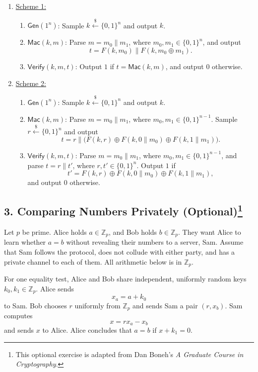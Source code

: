 \documentclass[11pt]{article}
\newcommand{\Gen}{\mathsf{Gen}}
\newcommand{\bin}{\{0,1\}}
\newcommand{\bit}{\bin}
\newcommand{\getsr}{\stackrel{\$}{\gets}}
\newcommand{\mac}{\mathsf{Mac}}
\newcommand{\verify}{\mathsf{Verify}}
\begin{document}
\begin{enumerate}
    \item \underline{Scheme 1:}
    \begin{enumerate}
        \item $\Gen(1^n)$: Sample $k\getsr\bit^n$ and output $k$.
        \item $\mac(k,m)$: Parse $m=m_0\mathbin\|m_1$, where
        $m_0,m_1\in\bit^n$, and output
        \[
            t=F(k,m_0)\mathbin\|F(k,m_0\oplus m_1).
        \]
        \item $\verify(k,m,t)$: Output $1$ if $t=\mac(k,m)$, and output
        $0$ otherwise.
    \end{enumerate}

    \item \underline{Scheme 2:}
    \begin{enumerate}
        \item $\Gen(1^n)$: Sample $k\getsr\bit^n$ and output $k$.
        \item $\mac(k,m)$: Parse $m=m_0\mathbin\|m_1$, where
        $m_0,m_1\in\bit^{n-1}$. Sample $r\getsr\bit^n$ and output
        \[
            t=r\mathbin\|\bigl(F(k,r)\oplus F(k,0\mathbin\|m_0)
              \oplus F(k,1\mathbin\|m_1)\bigr).
        \]
        \item $\verify(k,m,t)$: Parse $m=m_0\mathbin\|m_1$, where
        $m_0,m_1\in\bit^{n-1}$, and parse $t=r\mathbin\|t'$, where
        $r,t'\in\bit^n$. Output $1$ if
        \[
            t'=F(k,r)\oplus F(k,0\mathbin\|m_0)
                \oplus F(k,1\mathbin\|m_1),
        \]
        and output $0$ otherwise.
    \end{enumerate}
\end{enumerate}

\pagebreak

\subsection*{3. Comparing Numbers Privately (Optional)\footnote{This
optional exercise is adapted from Dan Boneh's \emph{A Graduate Course in
Cryptography}.}}

Let $p$ be prime. Alice holds $a\in\mathbb{Z}_p$, and Bob holds
$b\in\mathbb{Z}_p$. They want Alice to learn whether $a=b$ without
revealing their numbers to a server, Sam. Assume that Sam follows the
protocol, does not collude with either party, and has a private channel
to each of them. All arithmetic below is in $\mathbb{Z}_p$.

For one equality test, Alice and Bob share independent, uniformly random
keys $k_0,k_1\in\mathbb{Z}_p$. Alice sends
\[
    x_a=a+k_0
\]
to Sam. Bob chooses $r$ uniformly from $\mathbb{Z}_p$ and sends Sam a pair
$(r,x_b)$. Sam computes
\[
    x=rx_a-x_b
\]
and sends $x$ to Alice. Alice concludes that $a=b$ if $x+k_1=0$.
\end{document}
